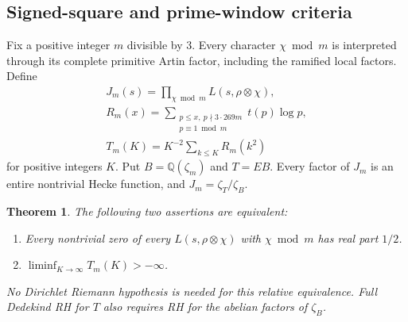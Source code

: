 \documentclass[11pt]{article}
\newtheorem{theorem}{Theorem}[section]
\newcommand{\Q}{\mathbb Q}
\begin{document}
\subsection*{Signed-square and prime-window criteria}
Fix a positive integer $m$ divisible by 3. Every character
$\chi\bmod m$ is interpreted through its complete primitive Artin
factor, including the ramified local factors. Define
\[
 \begin{gathered}
 J_m(s)=\prod_{\chi\bmod m}L(s,\rho\otimes\chi),\\
 R_m(x)=\sum_{\substack{p\le x,\ p\nmid3\cdot269m\\
                         p\equiv1\bmod m}}t(p)\log p,
 \\
 T_m(K)=K^{-2}\sum_{k\le K}R_m(k^2)
 \end{gathered}
\]
for positive integers $K$. Put $B=\Q(\zeta_m)$ and $T=EB$.
Every factor of $J_m$ is an entire nontrivial Hecke function, and
$J_m=\zeta_T/\zeta_B$.
\begin{theorem}\label{thm:squares}
The following two assertions are equivalent:
\begin{enumerate}
\item Every nontrivial zero of every $L(s,\rho\otimes\chi)$ with $\chi\bmod m$ has real part $1/2$.
\item $\liminf_{K\to\infty}T_m(K)>-\infty$.
\end{enumerate}
No Dirichlet Riemann hypothesis is needed for this relative equivalence. Full Dedekind RH for $T$ also requires RH for the abelian factors of $\zeta_B$.
\end{theorem}
\end{document}
